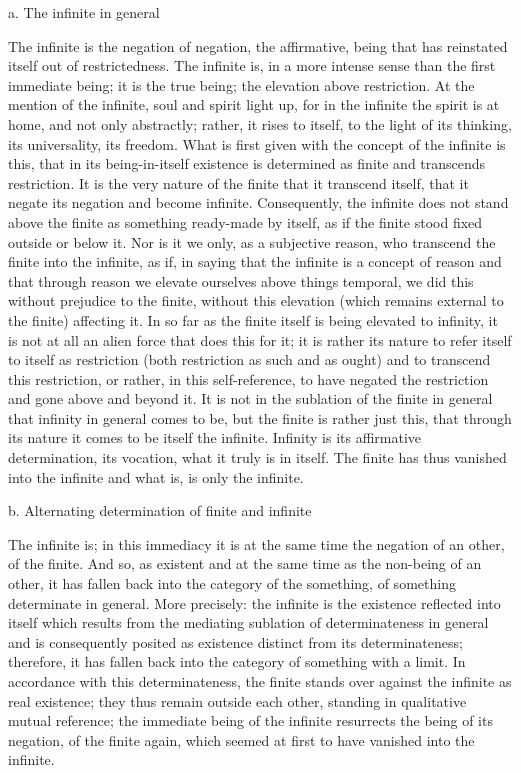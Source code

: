 a. The infinite in general

The infinite is the negation of negation, the affirmative,
being that has reinstated itself out of restrictedness.
The infinite is, in a more intense sense than the first immediate being;
it is the true being; the elevation above restriction.
At the mention of the infinite, soul and spirit light up,
for in the infinite the spirit is at home,
and not only abstractly;
rather, it rises to itself, to the light of its thinking,
its universality, its freedom.
What is first given with the concept of the infinite is this,
that in its being-in-itself existence is determined
as finite and transcends restriction.
It is the very nature of the finite
that it transcend itself,
that it negate its negation
and become infinite.
Consequently, the infinite does not stand
above the finite as something ready-made by itself,
as if the finite stood fixed outside or below it.
Nor is it we only, as a subjective reason,
who transcend the finite into the infinite,
as if, in saying that the infinite is a concept of reason
and that through reason we elevate ourselves above things temporal,
we did this without prejudice to the finite,
without this elevation
(which remains external to the finite)
affecting it.
In so far as the finite itself is being elevated to infinity,
it is not at all an alien force that does this for it;
it is rather its nature to refer itself to itself as restriction
(both restriction as such and as ought)
and to transcend this restriction,
or rather, in this self-reference,
to have negated the restriction
and gone above and beyond it.
It is not in the sublation of the finite in general
that infinity in general comes to be,
but the finite is rather just this,
that through its nature it comes to be itself the infinite.
Infinity is its affirmative determination,
its vocation, what it truly is in itself.
The finite has thus vanished into the infinite
and what is, is only the infinite.

b. Alternating determination of finite and infinite

The infinite is;
in this immediacy it is at the same time
the negation of an other, of the finite.
And so, as existent and at the same time as the
non-being of an other,
it has fallen back into the category of the something,
of something determinate in general.
More precisely: the infinite is the existence reflected into itself
which results from the mediating sublation of determinateness in general
and is consequently posited as existence distinct from its determinateness;
therefore, it has fallen back into the category of something with a limit.
In accordance with this determinateness,
the finite stands over against
the infinite as real existence;
they thus remain outside each other,
standing in qualitative mutual reference;
the immediate being of the infinite
resurrects the being of its negation,
of the finite again, which seemed at first
to have vanished into the infinite.

